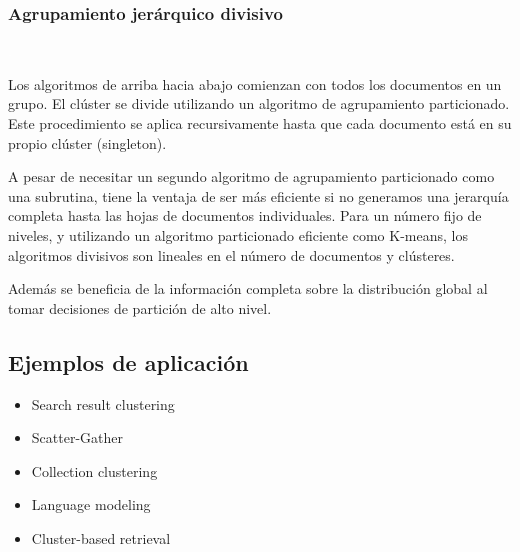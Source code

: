 \documentclass{llncs}
\begin{document}
\subsubsection{Agrupamiento jer\'arquico divisivo}

\textcolor{white}{.}

\vspace{0.5em}
Los algoritmos de arriba hacia abajo comienzan con todos los documentos en un grupo. El clúster se divide utilizando un algoritmo de agrupamiento particionado. Este procedimiento se aplica recursivamente hasta que cada documento está en su
propio clúster (singleton).

A pesar de necesitar un segundo algoritmo de agrupamiento particionado como una subrutina, tiene la ventaja de ser más eficiente si no generamos una jerarquía completa hasta las hojas de documentos individuales. Para un número fijo de niveles, y utilizando un algoritmo particionado eficiente como K-means, los algoritmos divisivos son lineales en el número de documentos y clústeres.

Adem\'as se beneficia de la información completa sobre la distribución global al tomar decisiones de partición de alto nivel.

\subsection{Ejemplos de aplicaci\'on} 
%
%

\begin{itemize}
	\item Search result clustering
	
	\item Scatter-Gather
	
	\item Collection clustering
	
	\item Language modeling
	
	\item Cluster-based retrieval
\end{itemize}
\end{document}

